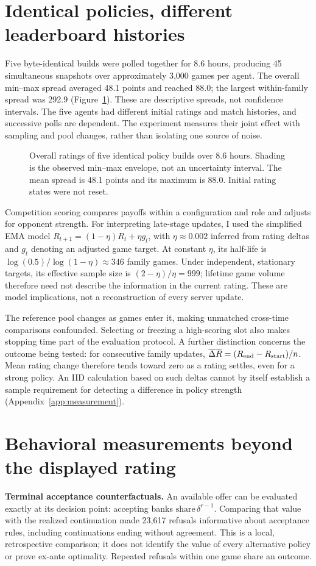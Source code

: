 \documentclass{article}
\begin{document}
\section{Identical policies, different leaderboard histories}
Five byte-identical builds were polled together for 8.6 hours, producing 45
simultaneous snapshots over approximately 3,000 games per agent. The overall
min--max spread averaged 48.1 points and reached 88.0; the largest within-family
spread was 292.9 (Figure~\ref{fig:noise}). These are descriptive spreads, not
confidence intervals. The five agents had different initial ratings and match
histories, and successive polls are dependent. The experiment measures their
joint effect with sampling and pool changes, rather than isolating one source
of noise.

\begin{figure}[t]
\centering

\caption{Overall ratings of five identical policy builds over 8.6 hours.
Shading is the observed min--max envelope, not an uncertainty interval.
The mean spread is 48.1 points and its maximum is 88.0. Initial rating states
were not reset.}
\label{fig:noise}
\end{figure}

Competition scoring compares payoffs within a configuration and role and adjusts
for opponent strength. For interpreting late-stage updates, I used the simplified
EMA model $R_{t+1}=(1-\eta)R_t+\eta g_t$, with $\eta\approx0.002$ inferred from
rating deltas and $g_t$ denoting an adjusted game target. At constant $\eta$, its
half-life is $\log(0.5)/\log(1-\eta)\approx346$ family games. Under independent,
stationary targets, its effective sample size is $(2-\eta)/\eta=999$; lifetime
game volume therefore need not describe the information in the current rating.
These are model implications, not a reconstruction of every server update.

The reference pool changes as games enter it, making unmatched cross-time
comparisons confounded. Selecting or freezing a high-scoring slot also makes
stopping time part of the evaluation protocol. A further distinction concerns
the outcome being tested: for consecutive family updates,
\mbox{$\overline{\Delta R}=(R_{\rm end}-R_{\rm start})/n$}.
Mean rating change therefore tends toward zero as a rating settles, even for
a strong policy. An IID calculation based on such deltas cannot by itself
establish a sample requirement for detecting a difference in policy strength
(Appendix~\ref{app:measurement}).

\section{Behavioral measurements beyond the displayed rating}
\textbf{Terminal acceptance counterfactuals.} An available offer can be evaluated
exactly at its decision point: accepting banks
$\mathrm{share}\,\delta^{r-1}$. Comparing that value with the realized continuation
made 23,617 refusals informative about acceptance rules, including continuations
ending without agreement. This is a local, retrospective comparison; it does not
identify the value of every alternative policy or prove ex-ante optimality.
Repeated refusals within one game share an outcome.
\end{document}
